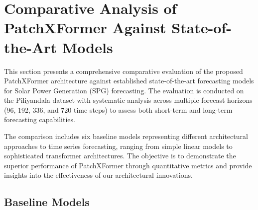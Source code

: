 \documentclass[12pt]{uomthesis}
\begin{document}
\section{Comparative Analysis of PatchXFormer Against State-of-the-Art Models}

This section presents a comprehensive comparative evaluation of the proposed PatchXFormer architecture against established state-of-the-art forecasting models for Solar Power Generation (SPG) forecasting. The evaluation is conducted on the Piliyandala dataset with systematic analysis across multiple forecast horizons (96, 192, 336, and 720 time steps) to assess both short-term and long-term forecasting capabilities.

The comparison includes six baseline models representing different architectural approaches to time series forecasting, ranging from simple linear models to sophisticated transformer architectures. The objective is to demonstrate the superior performance of PatchXFormer through quantitative metrics and provide insights into the effectiveness of our architectural innovations.

\subsection{Baseline Models}
\end{document}
